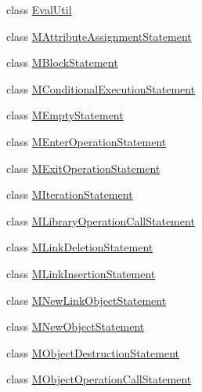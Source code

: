 \begin{DoxyCompactItemize}
\item 
class \hyperlink{classorg_1_1tzi_1_1use_1_1uml_1_1sys_1_1soil_1_1_eval_util}{Eval\-Util}
\item 
class \hyperlink{classorg_1_1tzi_1_1use_1_1uml_1_1sys_1_1soil_1_1_m_attribute_assignment_statement}{M\-Attribute\-Assignment\-Statement}
\item 
class \hyperlink{classorg_1_1tzi_1_1use_1_1uml_1_1sys_1_1soil_1_1_m_block_statement}{M\-Block\-Statement}
\item 
class \hyperlink{classorg_1_1tzi_1_1use_1_1uml_1_1sys_1_1soil_1_1_m_conditional_execution_statement}{M\-Conditional\-Execution\-Statement}
\item 
class \hyperlink{classorg_1_1tzi_1_1use_1_1uml_1_1sys_1_1soil_1_1_m_empty_statement}{M\-Empty\-Statement}
\item 
class \hyperlink{classorg_1_1tzi_1_1use_1_1uml_1_1sys_1_1soil_1_1_m_enter_operation_statement}{M\-Enter\-Operation\-Statement}
\item 
class \hyperlink{classorg_1_1tzi_1_1use_1_1uml_1_1sys_1_1soil_1_1_m_exit_operation_statement}{M\-Exit\-Operation\-Statement}
\item 
class \hyperlink{classorg_1_1tzi_1_1use_1_1uml_1_1sys_1_1soil_1_1_m_iteration_statement}{M\-Iteration\-Statement}
\item 
class \hyperlink{classorg_1_1tzi_1_1use_1_1uml_1_1sys_1_1soil_1_1_m_library_operation_call_statement}{M\-Library\-Operation\-Call\-Statement}
\item 
class \hyperlink{classorg_1_1tzi_1_1use_1_1uml_1_1sys_1_1soil_1_1_m_link_deletion_statement}{M\-Link\-Deletion\-Statement}
\item 
class \hyperlink{classorg_1_1tzi_1_1use_1_1uml_1_1sys_1_1soil_1_1_m_link_insertion_statement}{M\-Link\-Insertion\-Statement}
\item 
class \hyperlink{classorg_1_1tzi_1_1use_1_1uml_1_1sys_1_1soil_1_1_m_new_link_object_statement}{M\-New\-Link\-Object\-Statement}
\item 
class \hyperlink{classorg_1_1tzi_1_1use_1_1uml_1_1sys_1_1soil_1_1_m_new_object_statement}{M\-New\-Object\-Statement}
\item 
class \hyperlink{classorg_1_1tzi_1_1use_1_1uml_1_1sys_1_1soil_1_1_m_object_destruction_statement}{M\-Object\-Destruction\-Statement}
\item 
class \hyperlink{classorg_1_1tzi_1_1use_1_1uml_1_1sys_1_1soil_1_1_m_object_operation_call_statement}{M\-Object\-Operation\-Call\-Statement}

\end{DoxyCompactItemize}
